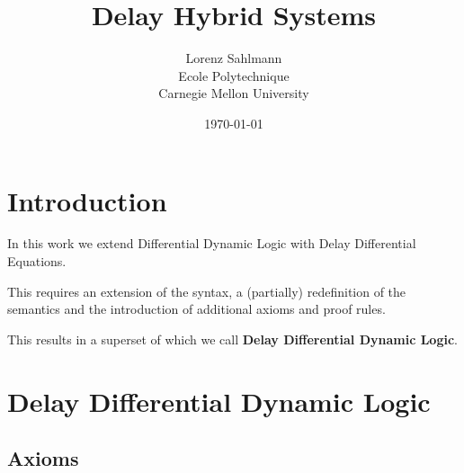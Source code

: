 \documentclass[10pt]{report}
\begin{document}
\title{Delay Hybrid Systems}

\author{Lorenz Sahlmann\\ Ecole Polytechnique\\ Carnegie Mellon University}
\date{\today}

\maketitle

\chapter{Introduction}
In this work we extend Differential Dynamic Logic with Delay Differential Equations.

This requires an extension of the syntax, a (partially) redefinition of the semantics and the introduction of additional axioms and proof rules.

This results in a superset of \dL which we call \textbf{Delay Differential Dynamic Logic}.






%
\chapter{Delay Differential Dynamic Logic}
    \label{sec:delay-differential-dynamic-logic}

    \section{Axioms}
        \label{sec:axioms}



        \begin{calculus}
        \end{calculus}
\end{document}
